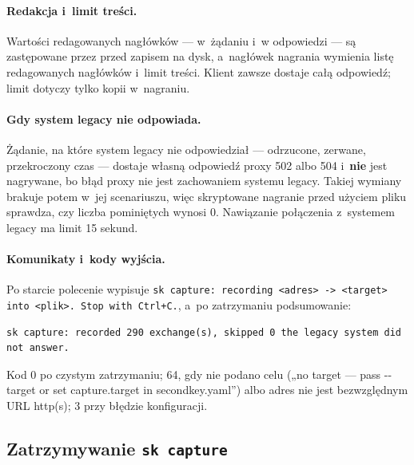 \paragraph{Redakcja i~limit treści.} Wartości redagowanych nagłówków --- w~żądaniu i~w
odpowiedzi --- są zastępowane przez  przed zapisem na dysk, a~nagłówek
nagrania wymienia listę redagowanych nagłówków i~limit treści. Klient zawsze dostaje całą
odpowiedź; limit dotyczy tylko kopii w~nagraniu.

\paragraph{Gdy system legacy nie odpowiada.} Żądanie, na które system legacy nie odpowiedział
--- odrzucone, zerwane, przekroczony czas --- dostaje własną odpowiedź proxy 502 albo 504 i~\textbf{nie} jest nagrywane, bo błąd proxy nie jest zachowaniem systemu legacy. Takiej wymiany
brakuje potem w~jej scenariuszu, więc skryptowane nagranie przed użyciem pliku sprawdza, czy
liczba pominiętych wynosi 0. Nawiązanie połączenia z~systemem legacy ma limit 15 sekund.

\paragraph{Komunikaty i~kody wyjścia.} Po starcie polecenie wypisuje
\texttt{sk capture: recording <adres> -> <target> into <plik>. Stop with Ctrl+C.}, a~po
zatrzymaniu podsumowanie:

\begin{lstlisting}
sk capture: recorded 290 exchange(s), skipped 0 the legacy system did not answer.
\end{lstlisting}

Kod 0 po czystym zatrzymaniu; 64, gdy nie podano celu („no target --- pass -{}-target or set
capture.target in secondkey.yaml”) albo adres nie jest bezwzględnym URL http(s); 3 przy
błędzie konfiguracji.


\subsection{Zatrzymywanie \texttt{sk capture}}\label{sec:cli-stop}

